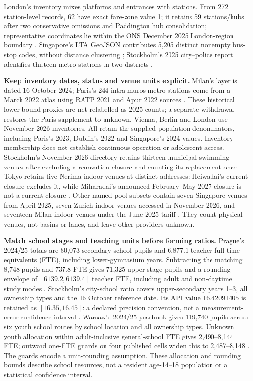 London's inventory mixes platforms and entrances with stations. From 272
station-level records, 62 have exact fare-zone value 1; it retains 59
stations/hubs after two conservative omissions and
Paddington hub consolidation; representative coordinates lie within the ONS
December 2025 London-region boundary \cite{tflinventory,onslondon}.
Singapore's LTA GeoJSON contributes 5,205 distinct nonempty bus-stop codes,
without distance clustering \cite{sgbus_lta}; Stockholm's 2025 city--police
report identifies thirteen metro stations in two districts \cite{stockholmmetro2025}.

\textbf{Keep inventory dates, status and venue units explicit.}
Milan's layer is dated 16 October 2024; Paris's 244 intra-muros metro stations
come from a March 2022 atlas using RATP 2021 and Apur 2022 sources
\cite{milanmetro,apur}. These historical lower-bound proxies are not relabelled
as 2025 counts; a separate withdrawal restores the Paris supplement to unknown.
Vienna, Berlin and London use November 2026 inventories. All retain the supplied
population denominators, including Paris's 2023, Dublin's 2022 and
Singapore's 2024 values. Inventory membership
does not establish continuous operation or adolescent access.
Stockholm's November 2026 directory retains thirteen municipal swimming venues after excluding a
renovation closure and counting its replacement once \cite{stockpool}.
Tokyo retains five Nerima indoor venues at distinct addresses: Heiwadai's
current closure excludes it, while Miharadai's announced February--May 2027
closure is not a current closure \cite{nerimapool,nerimaclose}.
Other named pool subsets contain seven Singapore venues from April 2025,
seven Zurich indoor venues accessed in November 2026, and seventeen Milan
indoor venues under the June 2025 tariff \cite{sgpool_2025,zurichpool,milanpool2025}.
They count physical venues, not basins or lanes, and leave other providers unknown.

\textbf{Match school stages and teaching units before forming ratios.}
Prague's 2024/25 totals are 80,073 secondary-school pupils and 6,877.1
teacher full-time equivalents (FTE), including lower-gymnasium years. Subtracting the matching
8,748 pupils and 737.8 FTE gives 71,325 upper-stage pupils and
a rounding envelope of $[6139.2,6139.4]$ teacher FTE, including adult and non-daytime study modes
\cite{prague}. Stockholm's city-school ratio covers upper-secondary years 1--3, all ownership
types and the 15 October reference date. Its API value 16.42091405 is retained
as $[16.35,16.45]$: a declared precision convention, not a measurement-error
confidence interval \cite{kolada}.
Warsaw's 2024/25 yearbook gives 119,740 pupils across six youth school routes
by school location and all ownership types. Unknown youth allocation within
adult-inclusive general-school FTE gives 2,490--8,144 FTE; outward one-FTE
guards on four published cells widen this to 2,487--8,148 \cite{warsawedu2025}.
The guards encode a unit-rounding assumption. These allocation and rounding
bounds describe school resources, not a resident age-14--18 population or a
statistical confidence interval.

